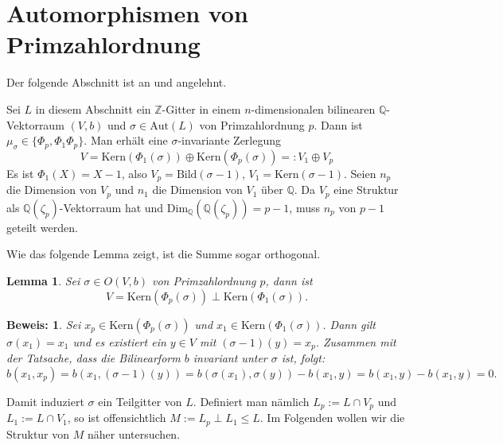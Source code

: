 \documentclass[12pt,a4paper,halfparskip,headsepline,bibtotocnumbered]{scrreprt}
\theoremstyle{nummermitklammern}
\newtheorem{lemma}[defsatzusw]{Lemma}
\theoremstyle{nonumberbreak}
\newtheorem{beweis}{Beweis:}
\newcommand{\Z}{\mathbb{Z}}
\newcommand{\Q}{\mathbb{Q}}
\begin{document}
\section{Automorphismen von Primzahlordnung}
Der folgende Abschnitt ist an \cite[Kap. 4]{juergens} und \cite[Kap. 4]{nebe} angelehnt.\par
Sei $L$ in diesem Abschnitt ein $\Z$-Gitter in einem $n$-dimensionalen bilinearen $\Q$-Vektorraum $(V,b)$ und $\sigma \in \text{Aut}(L)$ von Primzahlordnung $p$. Dann ist $\mu_\sigma \in \lbrace \Phi_p, \Phi_1 \Phi_p \rbrace$. Man erhält eine $\sigma$-invariante Zerlegung
\begin{equation*}
	V = \text{Kern}(\Phi_1(\sigma)) \oplus \text{Kern}(\Phi_p(\sigma)) =: V_1 \oplus V_p
\end{equation*}
Es ist $\Phi_1(X) = X-1$, also $V_p = \text{Bild}(\sigma - 1)$, $V_1 = \text{Kern}(\sigma - 1)$. Seien $n_p$ die Dimension von $V_p$ und $n_1$ die Dimension von $V_1$ über $\Q$. Da $V_p$ eine Struktur als $\Q(\zeta_p)$-Vektorraum hat und $\text{Dim}_\Q(\Q(\zeta_p)) = p-1$, muss $n_p$ von $p-1$ geteilt werden.\par
Wie das folgende Lemma zeigt, ist die Summe sogar orthogonal.

\begin{framed}
	\begin{lemma}
		Sei $\sigma \in O(V,b)$ von Primzahlordnung $p$, dann ist
		\begin{equation*}
			V = \text{Kern}(\Phi_p(\sigma)) \perp \text{Kern}(\Phi_1(\sigma)).
		\end{equation*}
	\end{lemma}
\end{framed}

\begin{beweis}
	Sei $x_p \in \text{Kern}(\Phi_p(\sigma))$ und $x_1 \in \text{Kern}(\Phi_1(\sigma))$. Dann gilt $\sigma(x_1) = x_1$ und es existiert ein $y \in V$ mit $(\sigma - 1)(y) = x_p$. Zusammen mit der Tatsache, dass die Bilinearform $b$ invariant unter $\sigma$ ist, folgt:
	\begin{equation*}
		b(x_1, x_p) = b(x_1, (\sigma-1)(y)) = b(\sigma(x_1), \sigma(y)) - b(x_1, y) = b(x_1, y) - b(x_1, y) = 0.
	\end{equation*}
\end{beweis}

Damit induziert $\sigma$ ein Teilgitter von $L$. Definiert man nämlich $L_p := L \cap V_p$ und $L_1 := L \cap V_1$, so ist offensichtlich $M := L_p \perp L_1 \leq L$. Im Folgenden wollen wir die Struktur von $M$ näher untersuchen.
\end{document}
